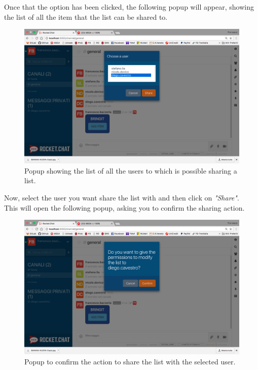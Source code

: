 Once that the option has been clicked, the following popup will appear, showing the list of all the item that the list can be shared to.

\begin{figure}[H]
  \centering 
  \includegraphics[width=\textwidth]{Sections/3-HowToUse/Images/popup_share_user.png}
  \caption{Popup showing the list of all the users to which is possible sharing a list.}
\end{figure}

Now, select the user you want share the list with and then click on \textit{"Share"}. \\
This will open the following popup, asking you to confirm the sharing action.

\begin{figure}[H]
  \centering 
  \includegraphics[width=\textwidth]{Sections/3-HowToUse/Images/popup_share_user_confirm.png}
  \caption{Popup to confirm the action to share the list with the selected user.}
\end{figure}

